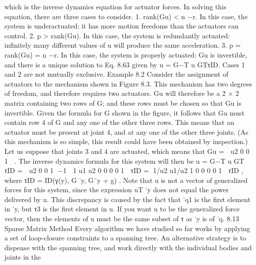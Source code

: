 which is the inverse dynamics equation for actuator forces. In solving this equation, there are three cases to consider. 1. rank(Gu) < n −r. In this case, the system is underactuated: it has more motion freedoms than the actuators can control. 2. p > rank(Gu). In this case, the system is redundantly actuated: infinitely many different values of u will produce the same acceleration. 3. p = rank(Gu) = n −r. In this case, the system is properly actuated: Gu is invertible, and there is a unique solution to Eq. 8.63 given by u = G−T u GTτID. Cases 1 and 2 are not mutually exclusive. Example 8.2 Consider the assignment of actuators to the mechanism shown in Figure 8.3. This mechanism has two degrees of freedom, and therefore requires two actuators. Gu will therefore be a 2 × 2 matrix containing two rows of G; and these rows must be chosen so that Gu is invertible. Given the formula for G shown in the figure, it follows that Gu must contain row 4 of G and any one of the other three rows. This means that an actuator must be present at joint 4, and at any one of the other three joints. (As this mechanism is so simple, this result could have been obtained by inspection.) Let us suppose that joints 3 and 4 are actuated, which means that Gu =  u2 0 0 1  . The inverse dynamics formula for this system will then be u = G−T u GT τID =  u2 0 0 1 −1  1 u1 u2 0 0 0 0 1  τID = 1/u2 u1/u2 1 0 0 0 0 1  τID , where τID = ID(γ(y), G ˙y, G¨y + g) . Note that u is not a vector of generalized forces for this system, since the expression uT ˙y does not equal the power delivered by u. This discrepancy is caused by the fact that ˙q1 is the first element in ˙y, but τ3 is the first element in u. If you want u to be the generalized force vector, then the elements of u must be the same subset of τ as ˙y is of ˙q. 8.13 Sparse Matrix Method Every algorithm we have studied so far works by applying a set of loop-closure constraints to a spanning tree. An alternative strategy is to dispense with the spanning tree, and work directly with the individual bodies and joints in the


